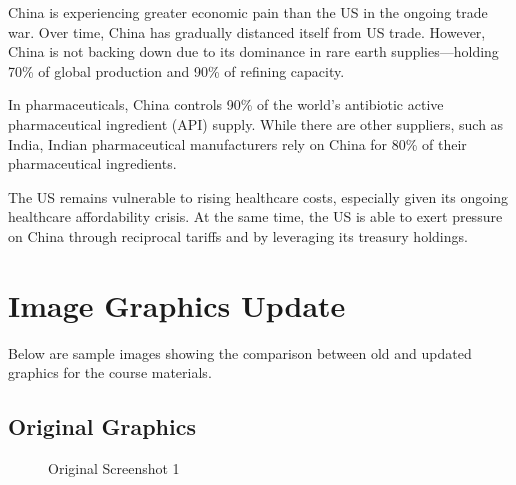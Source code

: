\documentclass[
  11pt,
]{article}
\begin{document}
China is experiencing greater economic pain than the US in the ongoing
trade war. Over time, China has gradually distanced itself from US
trade. However, China is not backing down due to its dominance in rare
earth supplies---holding 70\% of global production and 90\% of refining
capacity.

In pharmaceuticals, China controls 90\% of the world's antibiotic active
pharmaceutical ingredient (API) supply. While there are other suppliers,
such as India, Indian pharmaceutical manufacturers rely on China for
80\% of their pharmaceutical ingredients.

The US remains vulnerable to rising healthcare costs, especially given
its ongoing healthcare affordability crisis. At the same time, the US is
able to exert pressure on China through reciprocal tariffs and by
leveraging its treasury holdings.

\section{Image Graphics Update}\label{image-graphics-update}

Below are sample images showing the comparison between old and updated
graphics for the course materials.

\subsection{Original Graphics}\label{original-graphics}

\begin{figure}[H]


\caption{\label{fig-old1}Original Screenshot 1}

\end{figure}%
\end{document}
